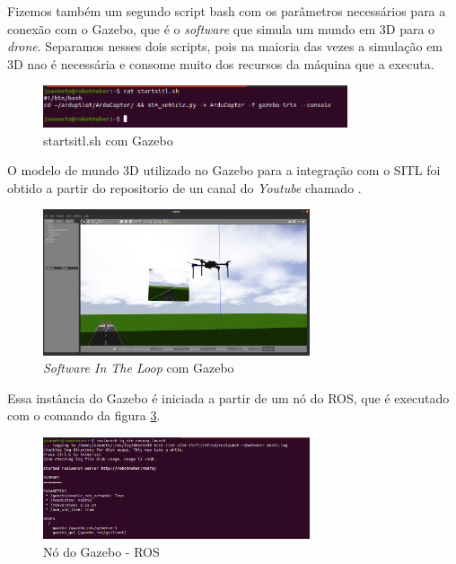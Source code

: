 \documentclass[12pt,a4paper,oneside]{book}
\begin{document}
Fizemos também um segundo script bash com os parâmetros necessários para a conexão com o Gazebo, que é o \textit{software} que simula um mundo em 3D para o \textit{drone}. Separamos nesses dois scripts, pois na maioria das vezes a simulação em 3D nao é necessária e consome muito dos recursos da máquina que a executa.

%
\begin{figure}[H]
  \centering
  \includegraphics[width=0.8\textwidth]{Images/Desenvolvimento/startsitl.sh.png}
  \caption{startsitl.sh com Gazebo}
  \label{fig:startsitl_nogazebo.png.0}
\end{figure}
%

O modelo de mundo 3D utilizado no Gazebo para a integração com o SITL foi obtido a partir do repositorio de un canal do \textit{Youtube} chamado \cite{url:iq}. 
%
\begin{figure}[H]
  \centering
  \includegraphics[width=0.7\textwidth]{Images/Desenvolvimento/sitl_gazebo.png}
  \caption{\textit{Software In The Loop} com Gazebo}
  \label{fig:sitl_gazebo.png.0}
\end{figure}
%
Essa instância do Gazebo é iniciada a partir de um nó do ROS, que é executado com o comando da figura \ref{fig:ros_gazebo.png.0}.
%
\begin{figure}[H]
  \centering
  \includegraphics[width=0.7\textwidth]{Images/Desenvolvimento/ros_gazebo.png}
  \caption{Nó do Gazebo - ROS}
  \label{fig:ros_gazebo.png.0}
\end{figure}
%
\end{document}
